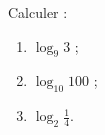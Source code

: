 
\begin{exercice}\label{exointerro-0004}

  Calculer :
  \begin{enumerate}
  \item $\log_{9} 3$ ;
    \item $\log_{10} 100$ ;
      \item $\displaystyle \log_{2} \frac{1}{4}$.
  \end{enumerate}


\end{exercice}
